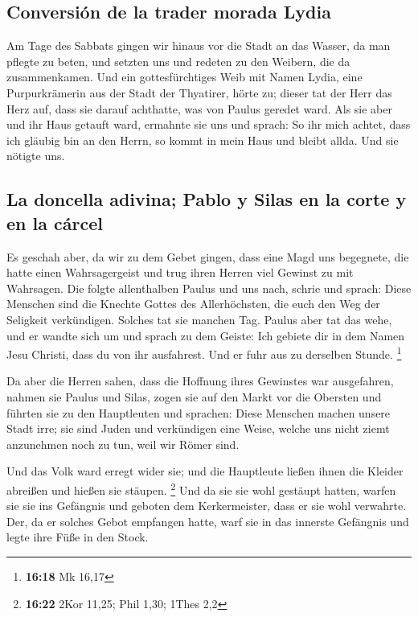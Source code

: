 \hypertarget{conversiuxf3n-de-la-trader-morada-lydia}{%
\subsection{Conversión de la trader morada
Lydia}\label{conversiuxf3n-de-la-trader-morada-lydia}}

 Am Tage des Sabbats gingen wir hinaus vor die Stadt an
das Wasser, da man pflegte zu beten, und setzten uns und redeten zu den
Weibern, die da zusammenkamen.  Und ein gottesfürchtiges
Weib mit Namen Lydia, eine Purpurkrämerin aus der Stadt der Thyatirer,
hörte zu; dieser tat der Herr das Herz auf, dass sie darauf achthatte,
was von Paulus geredet ward.  Als sie aber und ihr Haus
getauft ward, ermahnte sie uns und sprach: So ihr mich achtet, dass ich
gläubig bin an den Herrn, so kommt in mein Haus und bleibt allda. Und
sie nötigte uns.

\hypertarget{la-doncella-adivina-pablo-y-silas-en-la-corte-y-en-la-cuxe1rcel}{%
\subsection{La doncella adivina; Pablo y Silas en la corte y en la
cárcel}\label{la-doncella-adivina-pablo-y-silas-en-la-corte-y-en-la-cuxe1rcel}}

 Es geschah aber, da wir zu dem Gebet gingen, dass eine
Magd uns begegnete, die hatte einen Wahrsagergeist und trug ihren Herren
viel Gewinst zu mit Wahrsagen.  Die folgte allenthalben
Paulus und uns nach, schrie und sprach: Diese Menschen sind die Knechte
Gottes des Allerhöchsten, die euch den Weg der Seligkeit verkündigen.
 Solches tat sie manchen Tag. Paulus aber tat das wehe,
und er wandte sich um und sprach zu dem Geiste: Ich gebiete dir in dem
Namen Jesu Christi, dass du von ihr ausfahrest. Und er fuhr aus zu
derselben Stunde. \footnote{\textbf{16:18} Mk 16,17}

 Da aber die Herren sahen, dass die Hoffnung ihres
Gewinstes war ausgefahren, nahmen sie Paulus und Silas, zogen sie auf
den Markt vor die Obersten  und führten sie zu den
Hauptleuten und sprachen: Diese Menschen machen unsere Stadt irre; sie
sind Juden  und verkündigen eine Weise, welche uns nicht
ziemt anzunehmen noch zu tun, weil wir Römer sind.

 Und das Volk ward erregt wider sie; und die Hauptleute
ließen ihnen die Kleider abreißen und hießen sie stäupen. \footnote{\textbf{16:22}
  2Kor 11,25; Phil 1,30; 1Thes 2,2}  Und da sie sie wohl
gestäupt hatten, warfen sie sie ins Gefängnis und geboten dem
Kerkermeister, dass er sie wohl verwahrte.  Der, da er
solches Gebot empfangen hatte, warf sie in das innerste Gefängnis und
legte ihre Füße in den Stock.

